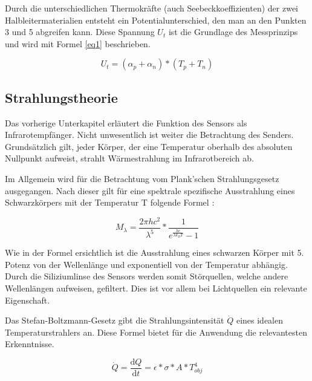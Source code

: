  Durch die unterschiedlichen Thermokräfte (auch Seebeckkoeffizienten) der zwei Halbleitermaterialien entsteht ein Potentialunterschied, den man an den Punkten 3 und 5 abgreifen kann. Diese Spannung $U_{t}$ ist die Grundlage des Messprinzips und wird mit Formel \ref{eq1} \protect\cite{AMG8834} beschrieben.


\begin{equation}
\label{eq1}
U_{t} = (\alpha_{p} + \alpha_{n})*(T_{p}+T_{n})
\end{equation}
\begin{center}

\end{center}


\subsection{Strahlungstheorie}
\label{subsec:Strahlungstheorie}
Das vorherige Unterkapitel erläutert die Funktion des Sensors als Infrarotempfänger. Nicht unwesentlich ist weiter die Betrachtung des Senders. Grundsätzlich gilt, jeder Körper, der eine Temperatur oberhalb des absoluten Nullpunkt aufweist, strahlt Wärmestrahlung im Infrarotbereich ab. 

Im Allgemein wird für die Betrachtung vom Plank'schen Strahlungsgesetz ausgegangen. Nach dieser gilt für eine spektrale spezifische Ausstrahlung eines Schwarzkörpers mit der Temperatur T folgende Formel \protect\cite{Thermoformeln}:

\begin{equation}
\label{eq2}
M_{\lambda } = \frac{2\pi h c^2 }{\lambda^5}*\frac{1}{e^\frac{hc}{\lambda k_{B} T}-1}
\end{equation}

Wie in der Formel ersichtlich ist die Ausstrahlung eines schwarzen Körper mit 5. Potenz von der Wellenlänge und exponentiell von der Temperatur abhängig. Durch die Siliziumlinse des Sensors werden somit Störquellen, welche andere Wellenlängen aufweisen, gefiltert. Dies ist vor allem bei Lichtquellen ein relevante Eigenschaft.

Das Stefan-Boltzmann-Gesetz \protect\cite{Thermoformeln} gibt die Strahlungsintensität $\dot{Q}$ eines idealen Temperaturstrahlers an. Diese Formel bietet für die Anwendung die relevantesten Erkenntnisse.


\begin{equation}
\label{eq3}
\dot{Q} = \frac{\mathrm{d} Q}{\mathrm{d} t} = \epsilon *\sigma * A * T_{obj}^4
\end{equation}


